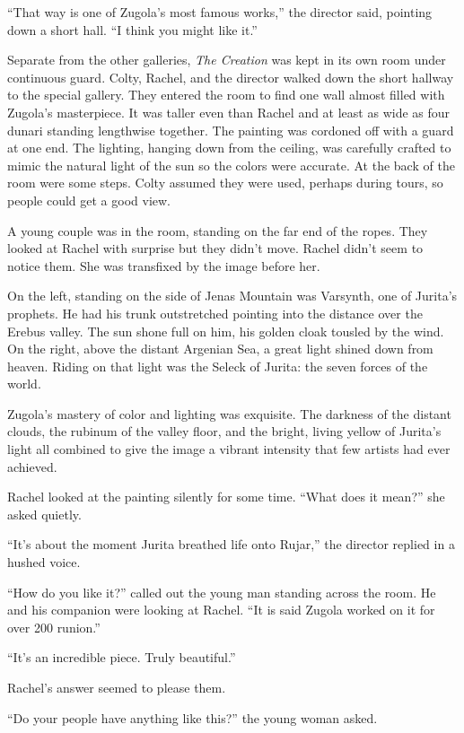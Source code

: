 ``That way is one of Zugola's most famous works,'' the director said, pointing down a short
hall. ``I think you might like it.''

Separate from the other galleries, \textit{The Creation} was kept in its own room under
continuous guard. Colty, Rachel, and the director walked down the short hallway to the special
gallery. They entered the room to find one wall almost filled with Zugola's masterpiece. It was
taller even than Rachel and at least as wide as four dunari standing lengthwise together. The
painting was cordoned off with a guard at one end. The lighting, hanging down from the ceiling,
was carefully crafted to mimic the natural light of the sun so the colors were accurate. At the
back of the room were some steps. Colty assumed they were used, perhaps during tours, so people
could get a good view.

A young couple was in the room, standing on the far end of the ropes. They looked at Rachel with
surprise but they didn't move. Rachel didn't seem to notice them. She was transfixed by the
image before her.

On the left, standing on the side of Jenas Mountain was Varsynth, one of Jurita's prophets. He
had his trunk outstretched pointing into the distance over the Erebus valley. The sun shone full
on him, his golden cloak tousled by the wind. On the right, above the distant Argenian Sea, a
great light shined down from heaven. Riding on that light was the Seleck of Jurita: the seven
forces of the world.

Zugola's mastery of color and lighting was exquisite. The darkness of the distant clouds, the
rubinum of the valley floor, and the bright, living yellow of Jurita's light all combined to
give the image a vibrant intensity that few artists had ever achieved.

Rachel looked at the painting silently for some time. ``What does it mean?'' she asked quietly.

``It's about the moment Jurita breathed life onto Rujar,'' the director replied in a hushed
voice.

``How do you like it?'' called out the young man standing across the room. He and his companion
were looking at Rachel. ``It is said Zugola worked on it for over 200 runion.''

``It's an incredible piece. Truly beautiful.''

Rachel's answer seemed to please them.

``Do your people have anything like this?'' the young woman asked.

